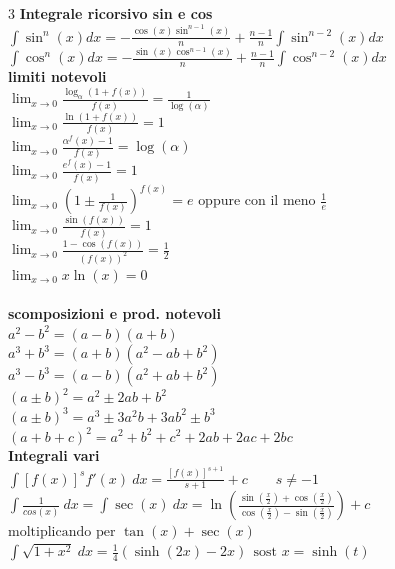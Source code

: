 \documentclass[a4paper, oneside]{article}
\begin{document}
\begin{multicols}{3}
    \noindent
\textbf{Integrale ricorsivo sin e cos}\\
    $\int \sin^n(x) dx = - \frac{\cos(x) \sin^{n-1}(x)}{n} + \frac{n-1}{n} \int \sin^{n-2}(x) dx$\\
    $\int \cos^n(x) dx = - \frac{\sin(x) \cos^{n-1}(x)}{n} + \frac{n-1}{n} \int \cos^{n-2}(x) dx$\\
\textbf{limiti notevoli}\\
        $\lim_{x \to 0} \frac{\log_\alpha (1+f(x))}{f(x)} = \frac{1}{\log(\alpha)}$\\
        $\lim_{x\to 0} \frac{\ln(1 + f(x))}{f(x)} = 1$\\
        $\lim_{x \to 0} \frac{\alpha^f(x)-1}{f(x)} = \log(\alpha)$\\
        $\lim_{x \to 0} \frac{e^f(x) -1}{f(x)} = 1$\\
        $\lim_{x \to 0} \left( 1 \pm \frac{1}{f(x)} \right)^{f(x)} = e \text{ oppure con il meno } \frac{1}{e} $\\
        $\lim_{x \to 0} \frac{\sin(f(x))}{f(x)} = 1$\\
        $\lim_{x \to 0} \frac{1 - \cos(f(x))}{(f(x))^2} = \frac{1}{2}$\\
        $\lim_{x \to 0} x \ln(x) = 0$\\
        \columnbreak\\
    \textbf{scomposizioni e prod. notevoli}\\
    $a^2 - b^2 = (a-b)(a+b)$\\
    $a^3+b^3 = (a+b)(a^2 - ab + b^2)$\\
    $a^3-b^3 = (a-b)(a^2 + ab + b^2)$\\
    $(a \pm b)^2 = a^2 \pm 2 ab + b^2$\\
    $(a \pm b)^3 = a^3 \pm 3a^2b + 3 ab^2 \pm b^3$\\
    $(a + b +c)^2 = a^2 + b^2 + c^2 + 2ab+2ac+2bc $\\
    \textbf{Integrali vari}\\
    $\int [f(x)]^s f'(x) \ dx = \frac{[f(x)]^{s+1}}{s+1} + c \qquad s \neq -1$\\
    $\int \frac{1}{cos(x)} \ dx = \int \sec(x) \ dx = \ln\left( \frac{\sin(\frac{x}{2}) + \cos(\frac{x}{2})}{\cos(\frac{x}{2}) - \sin(\frac{x}{2})} \right) + c \qquad $ \ \ $\text{moltiplicando per } \tan(x) + \sec(x)$\\
    $\int \sqrt{1 + x^2} \ dx = \frac{1}{4}(\sinh(2x) - 2x) \ \ \text{sost } x = \sinh(t)$ \\

\end{multicols}
\end{document}
